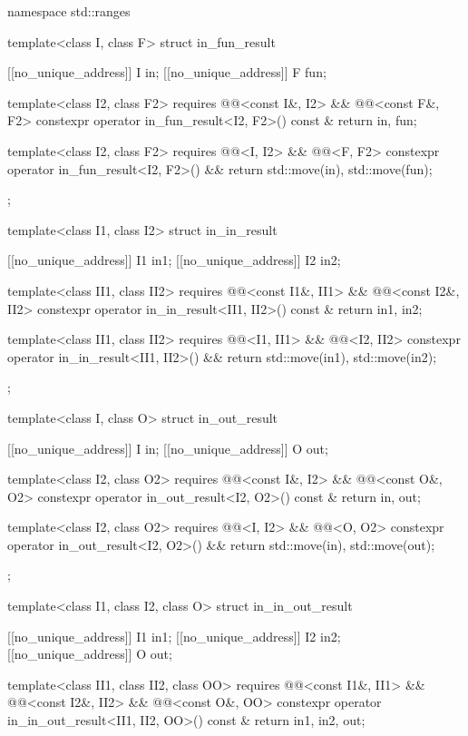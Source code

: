 \begin{codeblock}
namespace std::ranges {
  template<class I, class F>
  struct in_fun_result {
    [[no_unique_address]] I in;
    [[no_unique_address]] F fun;

    template<class I2, class F2>
      requires @@<const I&, I2> && @@<const F&, F2>
    constexpr operator in_fun_result<I2, F2>() const & {
      return {in, fun};
    }

    template<class I2, class F2>
      requires @@<I, I2> && @@<F, F2>
    constexpr operator in_fun_result<I2, F2>() && {
      return {std::move(in), std::move(fun)};
    }
  };

  template<class I1, class I2>
  struct in_in_result {
    [[no_unique_address]] I1 in1;
    [[no_unique_address]] I2 in2;

    template<class II1, class II2>
      requires @@<const I1&, II1> && @@<const I2&, II2>
    constexpr operator in_in_result<II1, II2>() const & {
      return {in1, in2};
    }

    template<class II1, class II2>
      requires @@<I1, II1> && @@<I2, II2>
    constexpr operator in_in_result<II1, II2>() && {
      return {std::move(in1), std::move(in2)};
    }
  };

  template<class I, class O>
  struct in_out_result {
    [[no_unique_address]] I in;
    [[no_unique_address]] O out;

    template<class I2, class O2>
      requires @@<const I&, I2> && @@<const O&, O2>
    constexpr operator in_out_result<I2, O2>() const & {
      return {in, out};
    }

    template<class I2, class O2>
      requires @@<I, I2> && @@<O, O2>
    constexpr operator in_out_result<I2, O2>() && {
      return {std::move(in), std::move(out)};
    }
  };

  template<class I1, class I2, class O>
  struct in_in_out_result {
    [[no_unique_address]] I1 in1;
    [[no_unique_address]] I2 in2;
    [[no_unique_address]] O  out;

    template<class II1, class II2, class OO>
      requires @@<const I1&, II1> &&
               @@<const I2&, II2> &&
               @@<const O&, OO>
    constexpr operator in_in_out_result<II1, II2, OO>() const & {
      return {in1, in2, out};
    }

}}
\end{codeblock}
